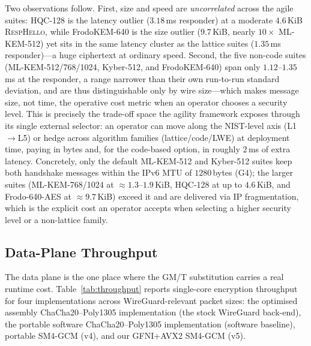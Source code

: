\documentclass{SCIS2026}
\newcommand{\respmsg}{\textsc{RespHello}\xspace}
\begin{document}
Two observations follow.  First, size and speed are
\emph{uncorrelated} across the agile suites: HQC-128 is the latency
outlier ($3.18$\,ms responder) at a moderate $4.6$\,KiB \respmsg, while
FrodoKEM-640 is the size outlier ($9.7$\,KiB, nearly $10\times$
ML-KEM-512) yet sits in the same latency cluster as the lattice suites
($1.35$\,ms responder)---a huge ciphertext at ordinary speed.  Second,
the five non-code suites (ML-KEM-512/768/1024, Kyber-512, and
FrodoKEM-640) span only $1.12$--$1.35$\,ms at the responder, a range
narrower than their own run-to-run standard deviation, and are thus
distinguishable only by wire size---which makes message size, not time,
the operative cost metric when an operator chooses a security level.
This is precisely the trade-off space the agility framework exposes
through its single external selector: an operator can move along the
NIST-level axis (L1$\to$L5) or hedge across algorithm families
(lattice/code/LWE) at deployment time, paying in bytes and, for the
code-based option, in roughly $2$\,ms of extra latency.  Concretely,
only the default ML-KEM-512 and Kyber-512 suites keep both handshake
messages within the IPv6 MTU of $1280$\,bytes (G4); the larger suites
(ML-KEM-768/1024 at $\approx 1.3$--$1.9$\,KiB, HQC-128 at up to
$4.6$\,KiB, and Frodo-640-AES at $\approx 9.7$\,KiB) exceed it and are
delivered via IP fragmentation, which is the explicit cost an operator
accepts when selecting a higher security level or a non-lattice family.

\subsection{Data-Plane Throughput}
\label{sec:q5}

The data plane is the one place where the GM/T substitution carries a
real runtime cost.  Table~\ref{tab:throughput} reports single-core
encryption throughput for four implementations across
WireGuard-relevant packet sizes: the optimised assembly
ChaCha20--Poly1305 implementation (the stock WireGuard back-end),
the portable software ChaCha20--Poly1305 implementation (software baseline),
portable SM4-GCM (v4), and our GFNI+AVX2 SM4-GCM (v5).
\end{document}
